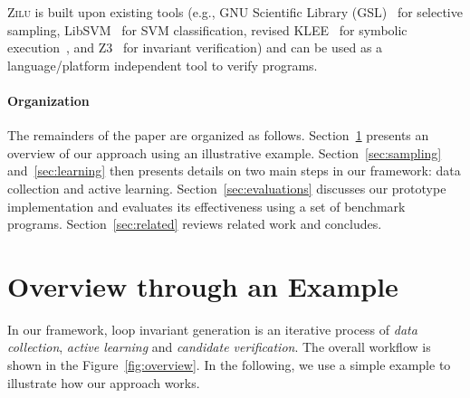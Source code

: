     \textsc{Zilu} is built upon existing tools (e.g., GNU Scientific Library (GSL)~\cite{gough2009gnu} for selective sampling,
    LibSVM~\cite{chang2011libsvm} for SVM classification,
    revised KLEE~\cite{cadar2008klee} for symbolic execution~\cite{king1976symbolic,symbolic}, and Z3~\cite{de2008z3} for invariant verification) and can be used as a language/platform independent tool to verify programs.

\paragraph{Organization} The remainders of the paper are organized as follows. Section~\ref{sec:overview} presents an overview of our approach using an illustrative example. Section~\ref{sec:sampling} and~\ref{sec:learning} then presents details on two main steps in our framework: data collection and active learning. Section~\ref{sec:evaluations} discusses our prototype implementation and evaluates its effectiveness using a set of benchmark programs. Section~\ref{sec:related} reviews related work and concludes.

\section{Overview through an Example} \label{sec:overview}
In our framework, loop invariant generation is an iterative process of \emph{data collection}, \emph{active learning} and \emph{candidate verification}. The overall workflow is shown in the Figure~\ref{fig:overview}. In the following, we use a simple example to illustrate how our approach works.

